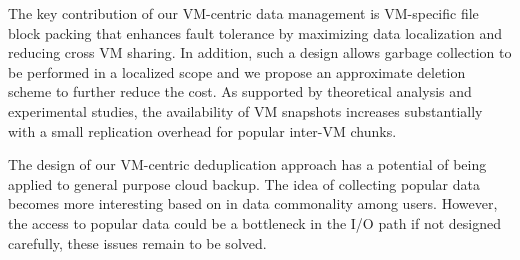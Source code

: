 The key contribution of our VM-centric data management is 
VM-specific file block packing that enhances fault tolerance by 
maximizing data localization and reducing cross VM sharing.
In addition, such a design allows garbage collection to be performed in a 
localized scope and we propose an approximate deletion
scheme to further reduce the cost.
As supported by theoretical analysis and experimental studies, 
the availability of VM snapshots increases substantially with a small
replication overhead for popular inter-VM chunks.

The design of our VM-centric deduplication approach has a potential of being applied
to general purpose cloud backup. The idea of collecting
popular data becomes more interesting based on in data commonality among users.
However, the access to popular data could be a bottleneck in the I/O path if not designed carefully,
these issues remain to be solved.

